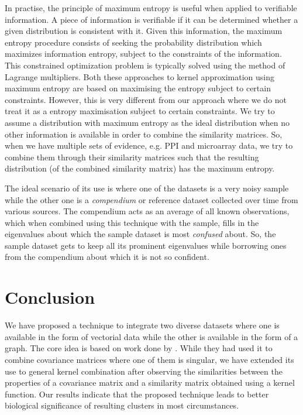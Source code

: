 In practise, the principle of maximum entropy is useful when applied to verifiable information. A piece of information is verifiable if it can 
be determined whether a given distribution is consistent with it. Given this information, the maximum entropy procedure consists 
of seeking the probability distribution which maximizes information entropy, subject to the constraints of the information. This constrained 
optimization problem is typically solved using the method of Lagrange multipliers. Both these approaches to kernel 
approximation 
\citep{Tsuda2004Learning, fujibuchi2007classification} using maximum entropy are based on maximising the entropy subject to certain 
constraints. However, this is very different from our approach where we do not treat it as a entropy maximisation subject to certain constraints. 
We try to assume a distribution with maximum entropy as the ideal distribution when no other information is available in order to combine the 
similarity matrices. So, when we have multiple sets of evidence, e.g. PPI and microarray data, we try to combine them through their similarity 
matrices such that the resulting distribution (of the combined similarity matrix) has the maximum entropy.

The ideal scenario of its use is where one of the datasets is a very noisy sample while the other one is a \textit{compendium} or 
reference dataset collected over time from various sources. The compendium acts as an average of all known observations, which when 
combined using this technique with the sample, fills in the eigenvalues about which the sample dataset is most \textit{confused} about. 
So, the sample dataset gets to keep all its prominent eigenvalues while borrowing ones from the compendium about which it is not so confident. 


\section{Conclusion}

We have proposed a technique to integrate two diverse datasets where one is available in the form of vectorial data while the 
other is available in the form of a graph. The core idea is based on work done by \citet{thomaz2004covariance}. While they had 
used it to combine covariance matrices where one of them is singular, we have extended its use to general kernel combination after 
observing the similarities between the properties of a covariance matrix and a similarity matrix obtained using a kernel function. Our 
results indicate that the proposed technique leads to better biological significance of resulting clusters in most circumstances.

